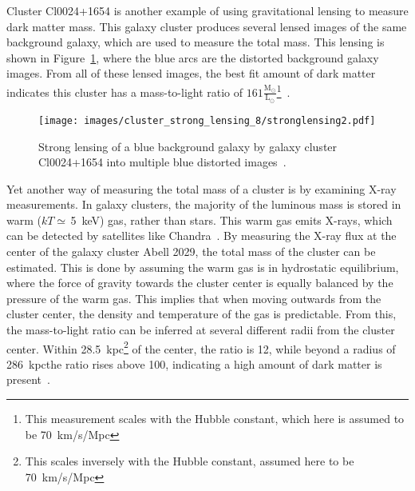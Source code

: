 Cluster \mbox{Cl0024+1654} is another example of using gravitational lensing to measure dark matter mass.
This galaxy cluster produces several lensed images of the same background galaxy, which are used to measure the total mass.
This lensing is shown in Figure~\ref{fig:stronglens}, where the blue arcs are the distorted background galaxy images.
From all of these lensed images, the best fit amount of dark matter indicates this cluster has a mass-to-light ratio of $161 \frac{\textrm{M}_{\odot}}{\textrm{L}_{\odot}}$\footnote[3]{This measurement scales with the Hubble constant, which here is assumed to be \SI{70}{km/s/Mpc}}~\cite{cluster_strong_lensing_1996, cluster_strong_lensing_1998, cluster_strong_lensing_2010}.
    
\begin{figure}[!ht]
  \centering
  \texttt{[image: images/cluster\_strong\_lensing\_8/stronglensing2.pdf]}
  \caption[Gravitational Lensing in Cl0024+1654]{
    Strong lensing of a blue background galaxy by galaxy cluster Cl0024+1654 into multiple blue distorted images~\cite{cluster_strong_lensing_1996}.
  }
  \label{fig:stronglens}
\end{figure}
    
Yet another way of measuring the total mass of a cluster is by examining X-ray measurements.
In galaxy clusters, the majority of the luminous mass is stored in warm ($kT\simeq\,$\SI{5}{keV}) gas, rather than stars.
This warm gas emits X-rays, which can be detected by satellites like Chandra~\cite{chandra}.
By measuring the X-ray flux at the center of the galaxy cluster Abell 2029, the total mass of the cluster can be estimated.
This is done by assuming the warm gas is in hydrostatic equilibrium, where the force of gravity towards the cluster center is equally balanced by the pressure of the warm gas.
This implies that when moving outwards from the cluster center, the density and temperature of the gas is predictable.
From this, the mass-to-light ratio can be inferred at several different radii from the cluster center.
Within \SI{28.5}{kpc}\footnote[2]{This scales inversely with the Hubble constant, assumed here to be \SI{70}{km/s/Mpc}} of the center, the ratio is \SI{12}{}, while beyond a radius of \SI{286}{kpc}\footnotemark[2] the ratio rises above \SI{100}{}, indicating a high amount of dark matter is present~\cite{cluster_chandra}.

